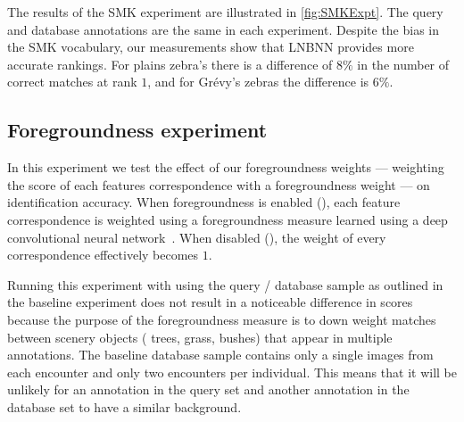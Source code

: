         The results of the SMK experiment are illustrated in \cref{fig:SMKExpt}. The query and database annotations
        are the same in each experiment. Despite the bias in the SMK vocabulary, our measurements show that LNBNN
        provides more accurate rankings. For plains zebra's there is a difference of $8\percent$ in the number of
        correct matches at rank $1$, and for Grévy's zebras the difference is $6\percent$.

        \SMKExpt{}

    \FloatBarrier{}
    \subsection{Foregroundness experiment}\label{sub:exptfg}

        In this experiment we test the effect of our foregroundness weights --- weighting the score of each
        features correspondence with a foregroundness weight --- on identification accuracy. When foregroundness is
        enabled (), each feature correspondence is weighted using a foregroundness measure learned using
        a deep convolutional neural network~\cite{parham_photographic_2015}. When disabled (), the
        weight of every correspondence effectively becomes $1$.

        Running this experiment with using the query / database sample as outlined in the baseline experiment does
        not result in a noticeable difference in scores because the purpose of the foregroundness measure is to
        down weight matches between scenery objects (\eg{} trees, grass, bushes) that appear in multiple
        annotations. The baseline database sample contains only a single images from each encounter and only two
        encounters per individual. This means that it will be unlikely for an annotation in the query set and
        another annotation in the database set to have a similar background.

